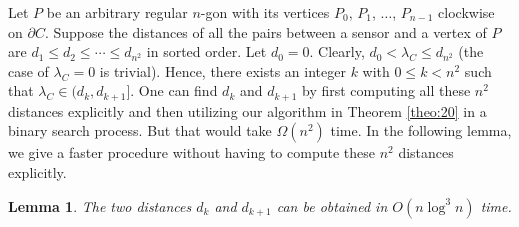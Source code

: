 \documentclass[11pt]{article}
\newtheorem{Lem}{Lemma}
\begin{document}
Let $P$ be an arbitrary regular $n$-gon with its vertices $P_0$,
$P_1$, $\ldots$, $P_{n-1}$ clockwise on $\partial C$. Suppose the
distances of all the pairs between a sensor and a vertex of $P$ are $d_1 \leq
d_2 \leq \cdots \leq d_{n^{2}}$ in sorted order. Let $d_0=0$.
Clearly, $d_0<\lambda_C\leq d_{n^2}$ (the case of $\lambda_C=0$ is
trivial). Hence, there exists an integer $k$ with $0\leq k<n^2$ such
that $\lambda_C\in (d_k,d_{k+1}]$. One can find $d_k$ and $d_{k+1}$
by first computing all these $n^2$ distances explicitly and then utilizing
our algorithm in Theorem \ref{theo:20} in a binary search process.
But that would take $\Omega(n^2)$
time. In the following lemma, we give a faster procedure without
having to compute these $n^2$ distances explicitly.

\begin{Lem}\label{lem:new20}
The two distances $d_k$ and $d_{k+1}$
can be obtained in $O(n\log^3 n)$ time.
\end{Lem}
\end{document}
